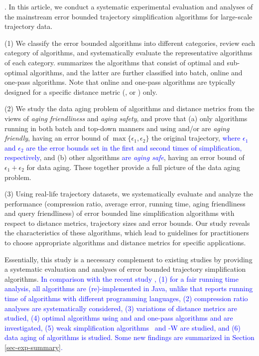 {.
In this article, we conduct a systematic experimental evaluation and analyses of the mainstream error bounded trajectory simplification algorithms for large-scale trajectory data.

\stab (1) We classify the error bounded \lsa algorithms into different categories, review each category of algorithms, and systematically evaluate the representative algorithms of each category.
%
 summarizes the algorithms that consist of optimal and sub-optimal algorithms, and the latter are further classified into batch, online and one-pass algorithms.
Note that online and one-pass algorithms are typically designed for a specific distance metric  (\ped, \sed or \dad) only.

\stab (2) {We study the data aging problem of \lsa algorithms and distance metrics from the views of \emph{aging friendliness} and \emph{aging safety}, and prove that (a) only algorithms running in both batch and top-down manners and using \ped and/or \sed are \emph{aging friendly}, having an error bound of $\max{\{\epsilon_1, \epsilon_2\}}$ \wrt the original trajectory, \textcolor{blue}{where $\epsilon_1$ and $\epsilon_2$ are the error bounds set in the first and second times of simplification, respectively}, and (b) other algorithms \textcolor{blue}{are \emph{aging safe}}, having an error bound of ${\epsilon_1+\epsilon_2}$ for data aging.  These together provide a full picture of the data aging problem.}

\stab (3) Using real-life trajectory datasets, we systematically evaluate and analyze the performance (compression ratio, average error, running time, {aging friendliness and query friendliness}) of error bounded line simplification algorithms with respect to {distance metrics,} trajectory sizes and error bounds.
Our study reveals the characteristics of these algorithms, which lead to guidelines for practitioners to choose appropriate algorithms and distance metrics for specific applications.


Essentially, this study is a necessary complement to existing studies by providing a systematic evaluation and analyses of error bounded trajectory simplification algorithms.
\textcolor{blue}{In comparison with the recent study \cite{Zhang:Evaluation},
(1) for a fair running time analysis, all algorithms are (re)-implemented in Java, unlike \cite{Zhang:Evaluation} that reports running time of algorithms with different programming languages,
(2) compression ratio analyses are systematically considered,
(3) variations of distance metrics are studied,
(4) optimal algorithms using \ped and \sed and one-pass algorithms \siped and \cised are investigated,
(5) weak simplification algorithms \operba~and \cised-W are studied, and
(6) data aging of \lsa algorithms is studied.
Some new findings are summarized in Section \ref{sec-exp-summary}.}


}
